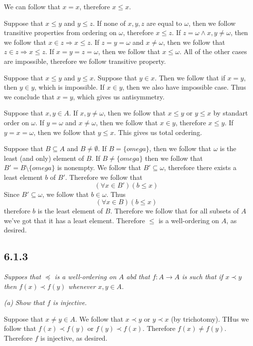 \documentclass[11pt,oneside,titlepage]{book}
\DeclareMathOperator \ra {\Rightarrow}
\begin{document}
We can follow that $x = x$, therefore $x \leq x$.

Suppose that $x \leq y$ and $y \leq z$.
If none of $x, y, z$ are equal to $\omega$, then we follow transitive properties
from ordering on $\omega$, therefore $x \leq z$.
If $z = \omega \land x, y \neq \omega$, then we follow that $x \in z \ra x \leq z$.
If $z = y = \omega$ and $x \neq \omega$, then we follow that $z \in z \ra x \leq z$.
If $x = y = z = \omega$, then we follow that $x \leq \omega$.
All of the other cases are impossible, therefore we follow transitive property.


Suppose that $x \leq y$ and $y \leq x$. Suppose that $y \in x$. Then we follow that
if $x = y$, then $y \in y$, which is impossible. If $x \in y$, then we also have impossible
case. Thus we conclude that $x = y$, which gives us antisymmetry.

Suppose that $x, y \in A$. If $x, y \neq \omega$, then we follow that $x \leq y$
or $y \leq x$ by standart order on $\omega$. If $y = \omega$ and $x \neq \omega$, then
we follow that $x \in y$, therefore $x \leq y$. If $y = x = \omega$, then we follow that
$y \leq x$. This gives us total ordering.

Suppose that $B \subseteq A$ and $B \neq \emptyset$. If $B = \{omega\}$, then
we follow that $\omega$ is the least (and only) element of $B$. If
$B \neq \{omega\}$ then we follow that $B' = B \setminus \{omega\}$ is nonempty. We follow that
$B' \subseteq \omega$, therefore there exists a least element $b$ of $B'$. Therefore
we follow that
$$(\forall x \in B')(b \leq x)$$
Since $B' \subseteq \omega$, we follow that $b \in \omega$. Thus
$$(\forall x \in B)(b \leq x)$$
therefore $b$ is the least element of $B$. Therefore we follow that
for all subsets of $A$ we've got that it has a least element. Therefore
$\leq$ is a well-ordering on $A$, as desired.

\subsection*{6.1.3}

\textit{Suppoes that $\preceq$ is a well-ordering on $A$ abd that $f: A \to A$ is
  such that if $x \prec y$ then $f(x) \prec f(y)$ whenever $x, y \in A$. }

\textit{(a) Show that $f$ is injective.}

Suppose that $x \neq y \in A$. We follow that $x \prec y$ or $y \prec x$ (by trichotomy).
THus we follow that $f(x) \prec f(y)$ or $f(y) \prec f(x)$. Therefore $f(x) \neq f(y)$.
Therefore $f$ is injective, as desired.
\end{document}

